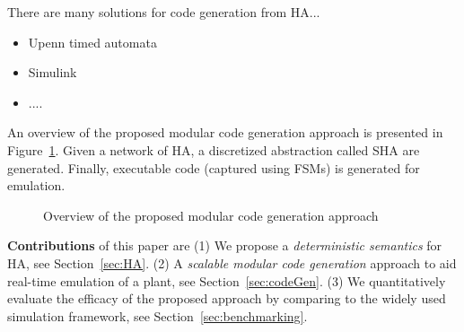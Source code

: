 There are many solutions for code generation from \acf{HA}...
\begin{itemize}
	\item Upenn timed automata
	\item Simulink
	\item ....
\end{itemize}
 

   
 An overview of the proposed modular code generation approach is presented
 in Figure~\ref{fig:overview}. Given a network
 of \ac{HA}, a discretized abstraction called \ac{SHA} are generated.
 Finally, executable code (captured using \acp{FSM}) is generated for emulation.
 
 \begin{figure}[bthp]
 	\centering
 	\scalebox{0.7}{
	 
	}
	 \caption{Overview of the proposed modular 
	 	code generation approach \label{fig:overview}}
\end{figure}
      
\textbf{Contributions} of this paper are 
(1) We propose a \emph{deterministic semantics} for \acf{HA}, see Section~\ref{sec:HA}.
(2) A \emph{scalable modular code generation} approach 
to aid real-time emulation of a plant, see Section~\ref{sec:codeGen}.
(3) We quantitatively evaluate the efficacy of the 
proposed approach by comparing  
to the widely used \simulink
simulation framework, see Section~\ref{sec:benchmarking}.
 
